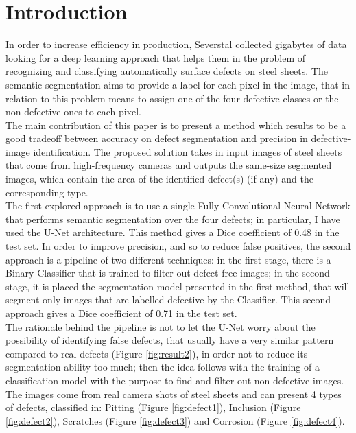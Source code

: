 \documentclass[10pt,twocolumn,letterpaper]{article}
\begin{document}
\section{Introduction}
   In order to increase efficiency in production, Severstal collected gigabytes of data looking for a deep learning approach that helps them in the problem of recognizing and classifying automatically surface defects on steel sheets. The semantic segmentation aims to provide a label for each pixel in the image, that in relation to this problem means to assign one of the four defective classes or the non-defective ones to each pixel.\\
   The main contribution of this paper is to present a method which results to be a good tradeoff between accuracy on defect segmentation and precision in defective-image identification. The proposed solution takes in input images of steel sheets that come from high-frequency cameras and outputs the same-size segmented images, which contain the area of the identified defect(s) (if any) and the corresponding type. \\
   The first explored approach is to use a single Fully Convolutional Neural Network that performs semantic segmentation over the four defects; in particular, I have used the U-Net architecture. This method gives a Dice coefficient of 0.48 in the test set.
   In order to improve precision, and so to reduce false positives, the second approach is a pipeline of two different techniques: in the first stage, there is a Binary Classifier that is trained to filter out defect-free images; in the second stage, it is placed the segmentation model presented in the first method, that will segment only images that are labelled defective by the Classifier. This second approach gives a Dice coefficient of 0.71 in the test set.\\ 
   The rationale behind the pipeline is not to let the U-Net worry about the possibility of identifying false defects, that usually have a very similar pattern compared to real defects (Figure \ref{fig:result2}), in order not to reduce its segmentation ability too much; then the idea follows with the training of a classification model with the purpose to find and filter out non-defective images.\\
   The images come from real camera shots of steel sheets and can present 4 types of defects, classified in: Pitting (Figure \ref{fig:defect1}), Inclusion (Figure \ref{fig:defect2}), Scratches (Figure \ref{fig:defect3}) and Corrosion (Figure \ref{fig:defect4}).
   
\end{document}
